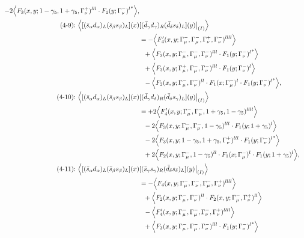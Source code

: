 \begin{align}
-2\Big\langle F_3(x,y;1-\gamma_5,1+\gamma_5,\Gamma_\nu^+)^{lll} \cdot {F_1(y;\Gamma_\nu^-)^l}^*\Big\rangle,
\\
\mbox{(4-9):}\ 
\Big\langle
[(\bar s_\alpha d_\alpha)_L(\bar s_\beta s_\beta)_L](x)&
[(\bar d_\gamma d_\gamma)_R(\bar d_\delta s_\delta)_L](y)\big|_{(I)}
\Big\rangle
\notag\\*
&=
 - \Big\langle F_4'(x,y;\Gamma_\mu^-,\Gamma_\mu^-,\Gamma_\nu^+,\Gamma_\nu^-)^{llll}\Big\rangle
\notag\\*&\ \ 
 + \Big\langle F_3(x,y;\Gamma_\mu^-,\Gamma_\mu^-,\Gamma_\nu^-)^{lll} \cdot {F_1(y;\Gamma_\nu^-)^l}^*\Big\rangle
\notag\\*&\ \ 
 + \Big\langle F_3(x,y;\Gamma_\mu^+,\Gamma_\mu^-,\Gamma_\nu^-)^{lll} \cdot F_1(y;\Gamma_\nu^-)^l\Big\rangle
\notag\\*&\ \ 
 - \Big\langle F_2(x,y;\Gamma_\mu^-,\Gamma_\nu^-)^{ll} \cdot F_1(x;\Gamma_\mu^-)^l \cdot {F_1(y;\Gamma_\nu^-)^l}^*\Big\rangle,
\\
\mbox{(4-10):}\ 
\Big\langle
[(\bar s_\alpha d_\alpha)_L(\bar s_\beta s_\beta)_L](x)&
[(\bar d_\gamma d_\delta)_R(\bar d_\delta s_\gamma)_L](y)\big|_{(I)}
\Big\rangle
\notag\\*
&=
 + 2\Big\langle F_4'(x,y;\Gamma_\mu^-,\Gamma_\mu^-,1+\gamma_5,1-\gamma_5)^{llll}\Big\rangle
\notag\\*&\ \ 
-2\Big\langle F_3(x,y;\Gamma_\mu^-,\Gamma_\mu^-,1-\gamma_5)^{lll} \cdot F_1(y;1+\gamma_5)^l\Big\rangle
\notag\\*&\ \ 
-2\Big\langle F_3(x,y;1-\gamma_5,1+\gamma_5,\Gamma_\nu^+)^{lll} \cdot {F_1(y;\Gamma_\nu^-)^l}^*\Big\rangle
\notag\\*&\ \ 
 + 2\Big\langle F_2(x,y;\Gamma_\mu^-,1-\gamma_5)^{ll} \cdot F_1(x;\Gamma_\mu^-)^l \cdot F_1(y;1+\gamma_5)^l\Big\rangle,
\\
\mbox{(4-11):}\ 
\Big\langle
[(\bar s_\alpha d_\alpha)_L(\bar s_\beta s_\beta)_L](x)&
[(\bar s_\gamma s_\gamma)_R(\bar d_\delta s_\delta)_L](y)\big|_{(I)}
\Big\rangle
\notag\\*
&=
 - \Big\langle F_4(x,y;\Gamma_\mu^-,\Gamma_\nu^-,\Gamma_\mu^-,\Gamma_\nu^+)^{llll}\Big\rangle
\notag\\*&\ \ 
 + \Big\langle F_2(x,y;\Gamma_\mu^-,\Gamma_\nu^-)^{ll} \cdot F_2(x,y;\Gamma_\mu^-,\Gamma_\nu^+)^{ll}\Big\rangle
\notag\\*&\ \ 
 - \Big\langle F_4'(x,y;\Gamma_\mu^-,\Gamma_\mu^-,\Gamma_\nu^-,\Gamma_\nu^+)^{llll}\Big\rangle
\notag\\*&\ \ 
 + \Big\langle F_3(x,y;\Gamma_\mu^-,\Gamma_\mu^-,\Gamma_\nu^-)^{lll} \cdot {F_1(y;\Gamma_\nu^-)^l}^*\Big\rangle

\end{align}
